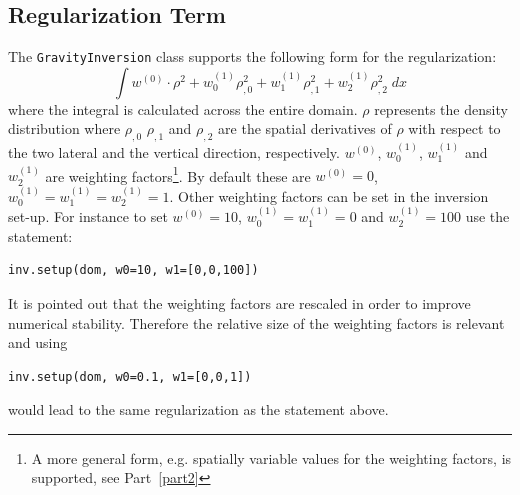 \subsection{Regularization Term}\label{SEC:P1:GRAV:REMARK:REG}
The \verb|GravityInversion| class supports the following form for the
regularization:
\begin{equation}
\int w^{(0)} \cdot \rho^2 + w^{(1)}_0  \rho_{,0}^2 +  w^{(1)}_1  \rho_{,1}^2 +  w^{(1)}_2  \rho_{,2}^2\; dx   
\end{equation}
where the integral is calculated across the entire domain.
$\rho$ represents the density distribution where $\rho_{,0}$ $\rho_{,1}$ and
$\rho_{,2}$ are the spatial derivatives of $\rho$ with respect to the two
lateral and the vertical direction, respectively.
$w^{(0)}$, $w^{(1)}_0$, $w^{(1)}_1$ and $w^{(1)}_2$ are weighting
factors\footnote{A more general form, e.g. spatially variable values for the
weighting factors, is supported, see Part~\ref{part2}}.
By default these are $w^{(0)}=0$, $w^{(1)}_0=w^{(1)}_1=w^{(1)}_2=1$.
Other weighting factors can be set in the inversion set-up.
For instance to set $w^{(0)}=10$, $w^{(1)}_0=w^{(1)}_1=0$ and $w^{(1)}_2=100$
use the statement:
\begin{verbatim}
inv.setup(dom, w0=10, w1=[0,0,100])
\end{verbatim}
It is pointed out that the weighting factors are rescaled in order to improve
numerical stability. Therefore the relative size of the weighting factors is
relevant and using
\begin{verbatim}
inv.setup(dom, w0=0.1, w1=[0,0,1])
\end{verbatim}
would lead to the same regularization as the statement above.

